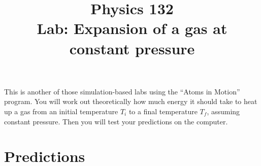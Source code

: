 \documentclass{article}
\begin{document}
\title{Physics 132\\
Lab: Expansion of a gas at constant pressure}
\maketitle


\bigskip\bigskip

This is another of those simulation-based labs using the ``Atoms in
Motion'' program.  You will work out theoretically how much energy it
should take to heat up a gas from an initial temperature $T_i$
to a final temperature $T_f$, assuming constant pressure.  Then you will
test your predictions on the computer.

\bigskip

\section{Predictions}
\end{document}
